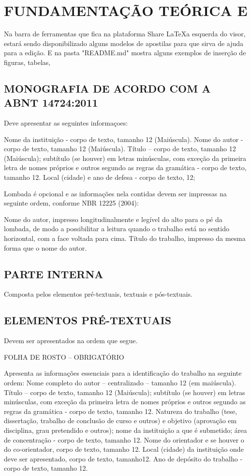 \section{FUNDAMENTAÇÃO TEÓRICA E}

Na barra de ferramentas que fica na plataforma Share \LaTeX a esquerda do visor, estará sendo disponibilizado alguns modelos de apostilas para que sirva de ajuda para a edição. E na pasta "README.md" mostra alguns exemplos de inserção de figuras, tabelas, 

\subsection{MONOGRAFIA DE ACORDO COM A ABNT 14724:2011}

Deve apresentar as seguintes informaçoes:

Nome da instituição - corpo de texto, tamanho 12 (Maiúscula).
Nome do autor - corpo de texto, tamanho 12 (Maiúscula). 
Título – corpo de texto, tamanho 12 (Maiúscula); subtítulo (se houver) em letras minúsculas, com exceção da primeira letra de nomes próprios e outros segundo as regras da gramática - corpo de texto, tamanho 12. Local (cidade) e ano de defesa - corpo de texto, 12; 

Lombada é opcional e as informações nela contidas devem ser impressas na seguinte ordem,
conforme NBR 12225 (2004):

Nome do autor, impresso longitudinalmente e legível do alto para o pé da
lombada, de modo a possibilitar a leitura quando o trabalho está no sentido horizontal,
com a face voltada para cima.
Título do trabalho, impresso da mesma forma que o nome do autor. 

\subsection{PARTE INTERNA}

Composta pelos elementos pré-textuais, textuais e pós-textuais.

\subsection{ELEMENTOS PRÉ-TEXTUAIS}
Devem ser apresentados na ordem que segue.

FOLHA DE ROSTO – OBRIGATÓRIO

Apresenta as informações essenciais para a identificação do trabalho na seguinte ordem:
Nome completo do autor – centralizado – tamanho 12 (em maiúscula). 
Título – corpo de texto, tamanho 12 (Maiúscula); subtítulo (se houver) em letras
minúsculas, com exceção da primeira letra de nomes próprios e outros segundo as
regras da gramática - corpo de texto, tamanho 12.
Natureza do trabalho (tese, dissertação, trabalho de conclusão de curso e outros) e
objetivo (aprovação em disciplina, grau pretendido e outros); nome da instituição a
que é submetido; área de concentração - corpo de texto, tamanho 12.
Nome do orientador e se houver o do co-orientador, corpo de texto, tamanho 12.
Local (cidade) da instituição onde deve ser apresentado, corpo de texto, tamanho12.
Ano de depósito do trabalho - corpo de texto, tamanho 12. 

